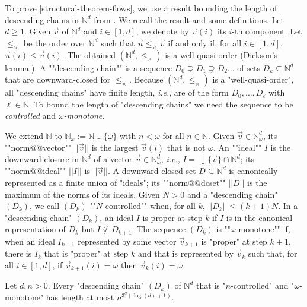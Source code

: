 \documentclass[10pt,a4paper]{article}
\let\mathbb\mathds
\renewcommand{\geq}{\geqslant}
\renewcommand{\leq}{\leqslant}
\newcommand{\nats}{\mathbb{N}}
\newcommand{\set}[1]{\{#1\}}
\newcommand{\nset}[2]{[#1,#2]}
\newcommand{\deff}{:=}
\newcommand{\norm}[1]{||#1||}
\let\olddownarrow\downarrow
\renewcommand*{\downarrow}{{\,\olddownarrow}}
\newcommand*{\downwardclosure}[1]{\downarrow #1}
\newcommand*{\omeganats}{\nats_{\omega}}
\newcommand*{\leprod}{\leq_{\times}}
\newcommand*{\idealnorm}[1]{||#1||}
\begin{document}
To prove \cref{structural-theorem-flows}, we use a result bounding the length of descending chains in \(\nats^d\) from \cite{LS21,SS23}.
We recall the result and some definitions.
%
Let \(d \geq 1\).
Given \(\vec{v}\) of \(\nats^d\) and \(i \in \nset{1}{d}\), we denote by \(\vec{v}(i)\) its \(i\)-th component.
Let \(\leprod\) be the order over \(\nats^d\) such that \(\vec{u} \leprod \vec{v}\) if and only if, for all \(i \in \nset{1}{d}\), \(\vec{u}(i) \leq \vec{v}(i)\).
The obtained \((\nats^d, \leprod)\) is a well-quasi-order (Dickson's lemma \cite{Dickson}).
A ""descending chain"" is a sequence \(D_0 \supsetneq D_1 \supsetneq D_2 \dots\) of sets \(D_k \subseteq \nats^d\) that are downward-closed for \(\leprod\).
%
%
Because \((\nats^d,\leprod)\) is a "well-quasi-order", all "descending chains" have finite length, \emph{i.e.}, are of the form \(D_0, \dots, D_\ell\) with \(\ell \in \nats\).
%
To bound the length of "descending chains" \cite{LS21,SS23} we need the sequence to be \emph{controlled} and \emph{\(\omega\)-monotone}.

We extend \(\nats\) to \(\omeganats \deff \nats \cup \set{\omega}\) with \(n < \omega\) for all \(n \in \nats\).
Given \(\vec{v} \in \omeganats^d\), its ""norm@@vector"" \(\norm{\vec{v}}\) is the largest \(\vec{v}(i)\) that is not \(\omega\).
An ""ideal"" \(I\) is the downward-closure in \(\nats^d\) of a vector \(\vec{v} \in \omeganats^d\), \emph{i.e.}, \(I = \downwardclosure{\{\vec{v}\}}\cap\nats^d\); its ""norm@@ideal"" \(\idealnorm{I}\) is \(\norm{\vec{v}}\).
A downward-closed set \(D \subseteq \nats^d\) is canonically represented as a finite union of "ideals"; its ""norm@@dcset"" \(\norm{D}\) is the maximum of the norms of its ideals.
Given \(N > 0\) and a "descending chain" \((D_k)\), we call \((D_k)\) ""\(N\)-controlled"" when, for all \(k\), \(\norm{D_k} \leq (k+1) N\).
%
In a "descending chain" \((D_k)\), an ideal \(I\) is proper at step \(k\) if \(I\) is in the canonical representation of \(D_k\) but \(I \nsubseteq D_{k+1}\).
The sequence \((D_k)\) is ""\(\omega\)-monotone"" if, when an ideal \(I_{k+1}\) represented by some vector \(\vec{v}_{k+1}\) is "proper" at step \(k+1\), there is \(I_k\) that is "proper" at step \(k\) and that is represented by \(\vec{v}_k\) such that, for all \(i \in \nset{1}{d}\), if \(\vec{v}_{k+1}(i) = \omega\) then \(\vec{v}_k(i) = \omega\).

\begin{theorem}[{\cite{SS23}}]
	\label{bound-descending-chains}
	Let \(d, n > 0\).
	Every "descending chain" \((D_k)\) of \(\nats^d\) that is "\(n\)-controlled" and "\(\omega\)-monotone" has length at most \(n^{3^{d} (\log(d)+1)}\).
\end{theorem}
\end{document}
